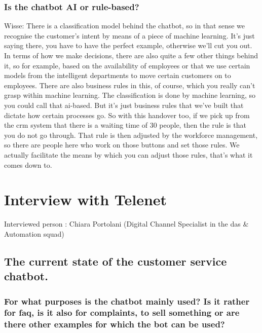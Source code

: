 \begin{appendices}
	\subsubsection{Is the chatbot AI or rule-based?}
	Wisse: There is a classification model behind the chatbot, so in that sense we recognise the customer's intent by means of a piece of machine learning. It's just saying there, you have to have the perfect example, otherwise we'll cut you out. In terms of how we make decisions, there are also quite a few other things behind it, so for example, based on the availability of employees or that we use certain models from the intelligent departments to move certain customers on to employees. There are also business rules in this, of course, which you really can't grasp within machine learning. The classification is done by machine learning, so you could call that \acrshort{ai}-based. But it's just business rules that we've built that dictate how certain processes go. So with this handover too, if we pick up from the \acrshort{crm} system that there is a waiting time of 30 people, then the rule is that you do not go through. That rule is then adjusted by the workforce management, so there are people here who work on those buttons and set those rules. We actually facilitate the means by which you can adjust those rules, that's what it comes down to.
	
	\section{Interview with Telenet}
	\label{in:Telenet}
	Interviewed person : Chiara Portolani (Digital Channel Specialist in the \acrfull{das} \& Automation squad)
	\subsection{The current state of the customer service chatbot.}
	\subsubsection{For what purposes is the chatbot mainly used? Is it rather for \acrshort{faq}, is it also for complaints, to sell something or are there other examples for which the bot can be used?}
	

\end{appendices}

